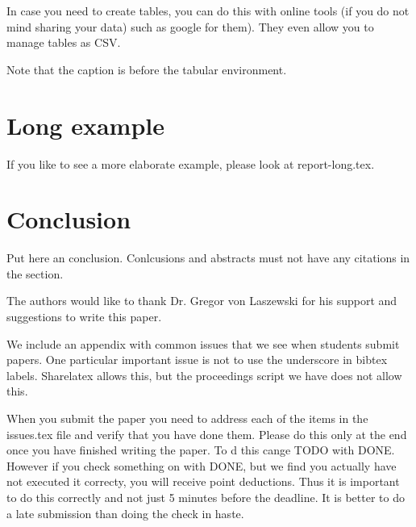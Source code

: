 \documentclass[sigconf]{acmart}
\begin{document}
In case you need to create tables, you can do this with online tools
(if you do not mind sharing your data) such as
google for them). They even allow you to manage tables as CSV.

Note that the caption is before the tabular environment.


\section{Long example}

If you like to see a more elaborate example, please look at
report-long.tex. 

\section{Conclusion}

Put here an conclusion. Conlcusions and abstracts must not have any
citations in the section.


\begin{acks}

  The authors would like to thank Dr. Gregor von Laszewski for his
  support and suggestions to write this paper.

\end{acks}


 

\appendix

We include an appendix with common issues that we see when students
submit papers. One particular important issue is not to use the
underscore in bibtex labels. Sharelatex allows this, but the
proceedings script we have does not allow this.

When you submit the paper you need to address each of the items in the
issues.tex file and verify that you have done them. Please do this
only at the end once you have finished writing the paper. To d this
cange TODO with DONE. However if you check something on with DONE, but
we find you actually have not executed it correcty, you will receive
point deductions. Thus it is important to do this correctly and not
just 5 minutes before the deadline. It is better to do a late
submission than doing the check in haste. 

%
\end{document}
